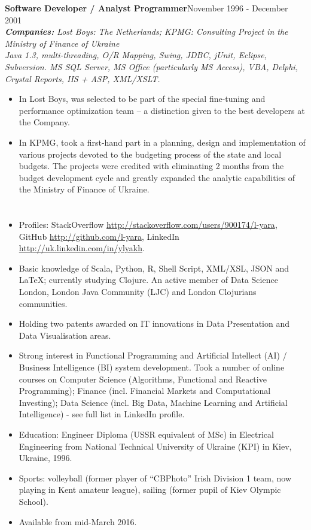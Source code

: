 \documentclass{res}
\newcommand{\aggjobdes}[4]{\needspace{3\baselineskip} %
{\noindent \bf #1\hspace{2ex}}{\hfill #2}\\
{{\noindent \small \textit{ \textbf{ Companies:} {\hfill #3}}}}\\{{\it \small #4.}}}
\newcommand{\osection}[1]{\section{\sc {\Large \textbf{#1}\\}} \vspace{0.30cm}}
\begin{document}
\begin{resume}
\aggjobdes {Software Developer / Analyst Programmer}{November 1996 - December 2001}
{Lost Boys: The Netherlands; KPMG: Consulting Project in the Ministry of Finance of Ukraine}
{Java 1.3, multi-threading, O/R Mapping, Swing, JDBC, jUnit, Eclipse, Subversion. MS SQL Server, MS Office (particularly MS Access), VBA, Delphi, Crystal Reports, IIS + ASP, XML/XSLT}
\begin{itemize} %
 \item In Lost Boys, was selected to be part of the special fine-tuning and performance optimization team – a distinction given to the best developers at the Company.
 \item In KPMG, took a first-hand part in a planning, design and implementation of various projects devoted to the budgeting process of the state and local budgets.  The projects were credited with eliminating 2 months from the budget development cycle and greatly expanded the analytic capabilities of the Ministry of Finance of Ukraine.
\end{itemize}

\osection{SPECIALS}
\begin{itemize}
 \item Profiles: StackOverflow \url{http://stackoverflow.com/users/900174/l-yara}, GitHub \url{http://github.com/l-yara}, LinkedIn \url{http://uk.linkedin.com/in/ylyakh}.
 \item Basic knowledge of Scala, Python, R, Shell Script, XML/XSL, JSON and \LaTeX; currently studying Clojure. An active member of Data Science London, London Java Community (LJC) and London Clojurians communities.
\item Holding two patents awarded on IT innovations in Data Presentation and Data Visualisation areas.
 \item Strong interest in Functional Programming and Artificial Intellect (AI) / Business Intelligence (BI) system development. Took a number of online courses on Computer Science (Algorithms, Functional and Reactive Programming); Finance (incl. Financial Markets and Computational Investing); Data Science (incl. Big Data, Machine Learning and Artificial Intelligence) - see full list in LinkedIn profile.
 \item Education: Engineer Diploma (USSR equivalent of MSc) in Electrical Engineering from National Technical University of Ukraine (KPI) in Kiev, Ukraine, 1996.
 \item Sports: volleyball (former player of ``CBPhoto'' Irish Division 1 team, now playing in Kent amateur league), sailing (former pupil of Kiev Olympic School).
\item Available from mid-March 2016.
\end{itemize}


\end{resume}
\end{document}

